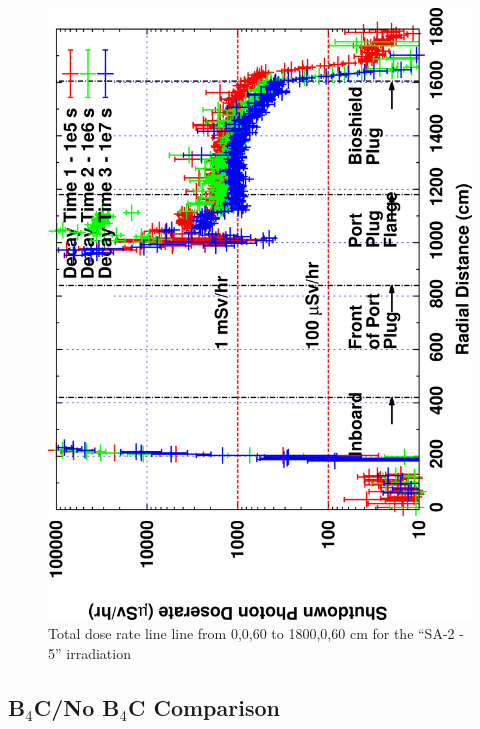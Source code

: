 \documentclass[12pt]{article}
\begin{document}
\begin{figure}[ht!]
\centering
\includegraphics[clip,scale=0.12,angle=-90]{../plots/photon_lineout/10yr/b4c_10yr.png}
\caption{Total dose rate line line from 0,0,60 to 1800,0,60 cm for the ``SA-2 - 5'' irradiation}
\label{fig:photons_10y_b4c_dose}
\end{figure}

\clearpage
\newpage
\subsection{B$_4$C/No B$_4$C Comparison}
\end{document}
